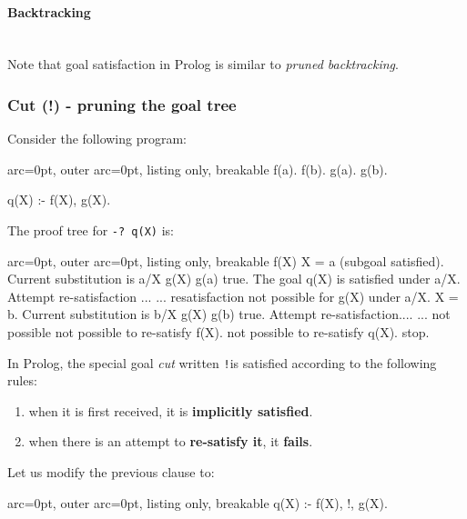 \paragraph{ Backtracking }\hfill\\

Note that goal satisfaction in Prolog is similar to \textit{pruned backtracking}. 

\subsubsection*{ Cut (!) - pruning the goal tree }

Consider the following program:

\begin{tcblisting}{ arc=0pt, outer arc=0pt, listing only, breakable}
f(a).
f(b).
g(a).
g(b).
     
q(X) :- f(X), g(X).

\end{tcblisting}


The proof tree for \texttt{-? q(X)} is:

\begin{tcblisting}{ arc=0pt, outer arc=0pt, listing only, breakable}
f(X)
  X = a (subgoal satisfied). Current substitution is {a/X}
    g(X)
      g(a) true. The goal q(X) is satisfied under {a/X}. Attempt re-satisfaction ...
      ... resatisfaction not possible for g(X) under {a/X}.
  X = b. Current substitution is {b/X}
     g(X)
       g(b) true. Attempt re-satisfaction....
       ... not possible
  not possible to re-satisfy f(X). 
not possible to re-satisfy q(X). stop.  

\end{tcblisting}


In Prolog, the special goal \textit{cut} written \texttt{!}is satisfied according to the following rules:
\begin{enumerate}
	\item  when it is first received, it is \textbf{implicitly satisfied}.
	\item  when there is an attempt to \textbf{re-satisfy it}, it \textbf{fails}.
\end{enumerate}

Let us modify the previous clause to:

\begin{tcblisting}{ arc=0pt, outer arc=0pt, listing only, breakable}
q(X) :- f(X), !, g(X).

\end{tcblisting}



